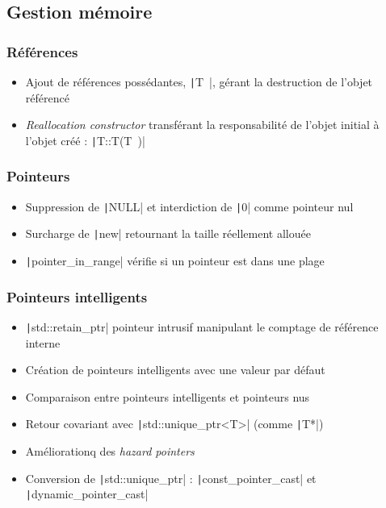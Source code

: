 \documentclass[C++.tex]{subfiles}
\begin{document}
\subsection*{Gestion mémoire}
\begin{frame}[fragile]
	\frametitle{Références}
	\begin{itemize}
		\item Ajout de références possédantes, \texttt|T~|, gérant la destruction de l'objet référencé
		\item \textit{Reallocation constructor} transférant la responsabilité de l'objet initial à l'objet créé : \texttt|T::T(T~)|
	\end{itemize}

\end{frame}

\begin{frame}[fragile]
	\frametitle{Pointeurs}
	\begin{itemize}
		\item Suppression de \texttt|NULL| et interdiction de \texttt|0| comme pointeur nul
		\item Surcharge de \texttt|new| retournant la taille réellement allouée
		\item \texttt|pointer_in_range| vérifie si un pointeur est dans une plage
	\end{itemize}

\end{frame}

\begin{frame}[fragile]
	\frametitle{Pointeurs intelligents}
	\begin{itemize}
		\item \texttt|std::retain_ptr| pointeur intrusif manipulant le comptage de référence interne
		\item Création de pointeurs intelligents avec une valeur par défaut
		\item Comparaison entre pointeurs intelligents et pointeurs nus
		\item Retour covariant avec \texttt|std::unique_ptr<T>| (comme \texttt|T*|)
		\item Améliorationq des \textit{hazard pointers}
		\item Conversion de \texttt|std::unique_ptr| : \texttt|const_pointer_cast| et \texttt|dynamic_pointer_cast|
	\end{itemize}

\end{frame}
\end{document}

